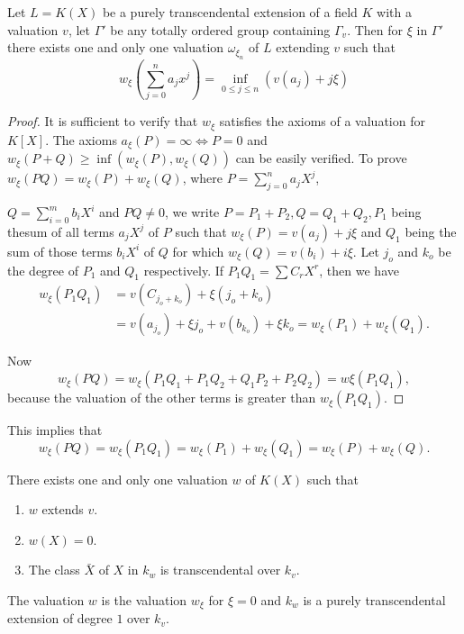 \begin{proposition}\label{part1:chap2:sec2:prop1}
  Let $L = K(X)$ be a purely transcendental extension of a field $K$
  with a valuation $v$, let $\Gamma'$ be any totally ordered group
  containing $\Gamma_v$. Then for $\xi$ in $\Gamma'$ there exists one
  and only one valuation $\omega_{\xi_n}$ of $L$ extending $v$ such that 
  $$
  w_\xi \left(\sum_{j=0}^{n} a_j x^j\right) = \inf\limits_{0 \leq j
    \leq n} \left(v  (a_j)+ j \xi\right) 
  $$ 
\end{proposition}

\begin{proof}%
  It is sufficient to verify that $w_\xi$ satisfies the axioms of a
  valuation for $K[X]$. The axioms $a_\xi (P) = \infty
  \Longleftrightarrow P=0$ and $w_\xi (P+Q) \geq \inf (w_\xi (P),
  w_\xi (Q))$ can be easily verified. To prove $w_\xi (PQ) = w_\xi
  (P)+ w_\xi (Q)$, where $P= \sum\limits_{j=0}^{n} a_j X^j$,  

  $Q = \sum\limits_{i=0}^{m} b_i X^i$ and $PQ \neq 0$, we write $P= P_1+
  P_2,Q= Q_1+Q_2, P_1$ being the\pageoriginale sum of all terms $a_j X^j$ of $P$ such
  that $w_\xi(P)=v(a_j)+j \xi$ and  
  $Q_1$ being the sum of those terms $b_iX^i $ of $Q$ for which
  $w_\xi(Q)=v(b_i) + i \xi$. Let $j_o$ and $k_o$ be the degree of $P_1$
  and $Q_1$ respectively. If $P_1 Q_1 = \sum C_r X^r$, then we have 
  \begin{align*} 
    w_\xi (P_1 Q_1) & =v(C_{j_o + k_o}) + \xi (j_o + k_o)\\
    & = v(a_{j_o})+\xi j_o + v(b_{k_o}) + \xi k_o = w_\xi (P_1) + w_\xi (Q_1).
  \end{align*}
  
  Now
  $$
  w_\xi (P Q) = w_\xi (P_1 Q_1 + P_1 Q_2 + Q_1 P_2 + P_2 Q_2) = w \xi
  (P_1 Q_1), 
  $$
  because the valuation of the other terms is greater than $w_\xi (P_1
  Q_1)$. 
\end{proof}

This implies that 
$$
w_\xi (P Q) = w_\xi (P_1 Q_1)= w_\xi (P_1) + w_\xi (Q_1) = w_\xi (P) +
w_\xi (Q).
$$
\begin{coro*}%
  There exists one and only one valuation $w$ of $K(X)$ such that
  \begin{enumerate}[\rm(i)]
  \item $w$ extends $v$.
  \item $w(X) = 0$.
  \item The class $\bar{X}$ of $X$ in $k_w$ is transcendental over $k_v$.
  \end{enumerate}
  
  The valuation $w$ is the valuation $w_\xi$ for $\xi = 0$ and $k_w$
  is a purely transcendental extension of degree $1$ over $k_v$. 
\end{coro*}

